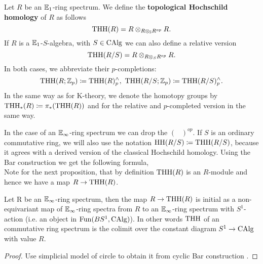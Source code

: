\begin{defn}
    Let $R$ be an $\mathbb{E}_1$-ring spectrum.
    We define the \textbf{topological Hochschild homology} of $R$ as follows
    \begin{equation*}
        \operatorname{THH}(R)=R\otimes_{R\otimes_{\mathbb{S}} R^{op}}R.
    \end{equation*}
    If $R$ is a $\mathbb{E}_1$-$S$-algebra, with $S\in\operatorname{CAlg}$ we can also define a relative version
    \begin{equation*}
        \operatorname{THH}(R/S)=R\otimes_{R\otimes_S R^{op}}R.
    \end{equation*}
    In both cases, we abbreviate their $p$-completions:
    \begin{equation*}
        \THH(R;\Z_p)\coloneqq\THH(R)^{\wedge}_p,\ \THH(R/S;\Z_p)\coloneqq\THH(R/S)^{\wedge}_p.
    \end{equation*}
    In the same way as for K-theory, we denote the homotopy groups by $\operatorname{THH}_*(R)\coloneqq \pi_*(\operatorname{THH}(R))$ and for the relative and $p$-completed version in the same way.
\end{defn}
In the case of an $\mathbb{E}_\infty$-ring spectrum we can drop the $(\phantom{R})^{op}$. If $S$ is an ordinary commutative ring, we will also use the notation $\operatorname{HH}(R/S)\coloneqq \operatorname{THH}(R/S)$, because it agrees with a derived version of the classical Hochschild homology.
Using the Bar construction we get the following formula, 
\\
Note for the next proposition, that by definition $\operatorname{THH}(R)$ is an $R$-module and hence we have a map $R\rightarrow\operatorname{THH}(R)$.

\begin{prop}\label{McClureSchwaenzlVogt}
Let R be an $\mathbb{E}_\infty$-ring spectrum, then the map $R\rightarrow \operatorname{THH}(R)$ is initial as a non-equivariant map of $\mathbb{E}_\infty$-ring spectra from $R$ to an $\mathbb{E}_\infty$-ring spectrum with $S^1$-action (i.e. an object in $\operatorname{Fun}(BS^1,\operatorname{CAlg})$). In other words $\operatorname{THH}$ of an commutative ring spectrum is the colimit over the constant diagram $S^1\rightarrow \operatorname{CAlg}$ with value $R$.
\end{prop}
\begin{proof}
    Use simplicial model of circle to obtain it from cyclic Bar construction \cite[114]{NS}.
\end{proof}


